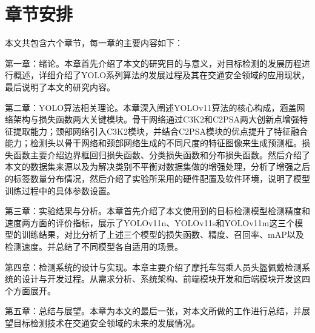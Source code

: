 \section{章节安排}
本文共包含六个章节，每一章的主要内容如下：

第一章：绪论。本章首先介绍了本文的研究目的与意义，对目标检测的发展历程进行概述，详细介绍了YOLO系列算法的发展过程及其在交通安全领域的应用现状，最后说明了本文的研究内容。

第二章：YOLO算法相关理论。本章深入阐述YOLOv11算法的核心构成，涵盖网络架构与损失函数两大关键模块。骨干网络通过C3K2和C2PSA两大创新点增强特征提取能力；颈部网络引入C3K2模块，并结合C2PSA模块的优点提升了特征融合能力；检测头以骨干网络和颈部网络生成的不同尺度的特征图像来生成预测框。损失函数主要介绍边界框回归损失函数、分类损失函数和分布损失函数。然后介绍了本文的数据集来源以及为解决类别不平衡对数据集做的增强处理，分析了增强之后的标签数量分布情况，然后介绍了实验所采用的硬件配置及软件环境，说明了模型训练过程中的具体参数设置。


第三章：实验结果与分析。本章首先介绍了本文使用到的目标检测模型检测精度和速度两方面的评价指标，展示了YOLOv11n、YOLOv11s和YOLOv11m这三个模型的训练结果，对比分析了上述三个模型的损失函数、精度、召回率、mAP以及检测速度。并总结了不同模型各自适用的场景。

第四章：检测系统的设计与实现。本章主要介绍了摩托车驾乘人员头盔佩戴检测系统的设计与开发过程。从需求分析、系统架构、前端模块开发和后端模块开发这四个方面展开。

第五章：总结与展望。本章为本文的最后一张，对本文所做的工作进行总结，并展望目标检测技术在交通安全领域的未来的发展情况。
